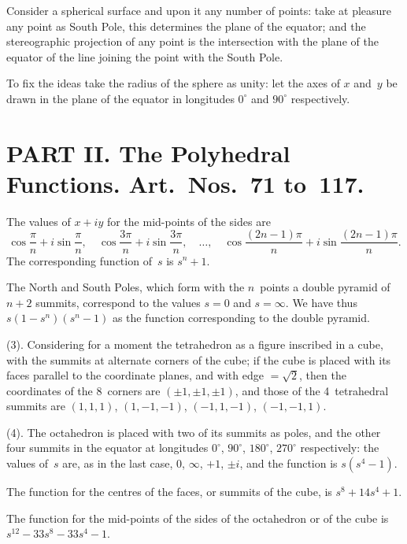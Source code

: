 \documentclass[11pt,a4paper]{book}
\begin{document}
\begin{art}
Consider a spherical surface and upon it any number of points: take at
pleasure any point as South Pole, this determines the plane of the
equator; and the stereographic projection of any point is the intersection
with the plane of the equator of the line joining the point with the South
Pole.

To fix the ideas take the radius of the sphere as unity: let the axes
of $x$ and~$y$ be drawn in the plane of the equator in longitudes $0^\circ$
and $90^\circ$ respectively.
\end{art}


\section*{PART II. The Polyhedral Functions. Art.~Nos.~71 to~117.}

\begin{art}
The values of $x + iy$ for the mid-points of the sides are
\[
\cos\frac{\pi}{n} + i\sin\frac{\pi}{n}, \quad
\cos\frac{3\pi}{n} + i\sin\frac{3\pi}{n}, \quad\ldots,\quad
\cos\frac{(2n-1)\pi}{n} + i\sin\frac{(2n-1)\pi}{n}.
\]
The corresponding function of~$s$ is $s^n + 1$.

The North and South Poles, which form with the $n$~points a double
pyramid of $n+2$ summits, correspond to the values $s = 0$ and $s = \infty$.
We have thus $s(1-s^n)(s^n-1)$ as the function corresponding to the
double pyramid.
\end{art}

\begin{art}
(3). Considering for a moment the tetrahedron as a figure inscribed in a
cube, with the summits at alternate corners of the cube; if the cube is
placed with its faces parallel to the coordinate planes, and with edge
$= \sqrt{2}$, then the coordinates of the 8~corners are $(\pm 1, \pm 1, \pm 1)$,
and those of the 4~tetrahedral summits are $(1,1,1)$, $(1,-1,-1)$,
$(-1,1,-1)$, $(-1,-1,1)$.
\end{art}

\begin{art}
(4). The octahedron is placed with two of its summits as poles, and the
other four summits in the equator at longitudes $0^\circ$, $90^\circ$, $180^\circ$,
$270^\circ$ respectively: the values of~$s$ are, as in the last case, $0$, $\infty$,
$+1$, $\pm i$, and the function is $s(s^4-1)$.

The function for the centres of the faces, or summits of the cube, is
$s^8 + 14s^4 + 1$.

The function for the mid-points of the sides of the octahedron or of the
cube is $s^{12} - 33s^8 - 33s^4 - 1$.
\end{art}
\end{document}
